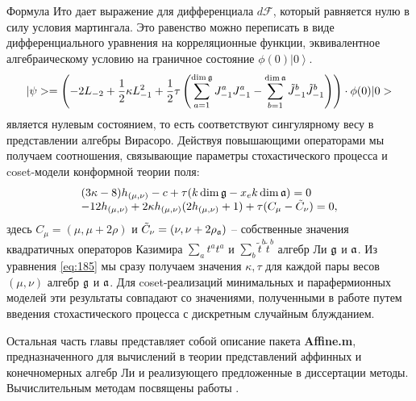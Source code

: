 \documentclass[14pt,autoref,href,facsimile
]{disser}
\begin{document}
Формула Ито дает выражение для дифференциала $d\mathcal{F}$, который равняется нулю в силу условия мартингала. Это равенство можно переписать в виде дифференциального уравнения на корреляционные функции, эквивалентное   алгебраическому условию на граничное состояние $\phi(0)\left|0\right>$.
\begin{multline}
\label{eq:126}
|\psi>=\left(-2L_{-2}+\frac{1}{2}\kappa L_{-1}^{2}+\frac{1}{2}\tau \left(\sum_{a=1}^{\dim\mathfrak{g}}J^{a}_{-1}J^{a}_{-1}-\sum_{b=1}^{\dim\mathfrak{a}}\tilde{J}^{b}_{-1}\tilde{J}^{b}_{-1}\right)\right)
\cdot\phi(0)|0>
\end{multline}
является нулевым состоянием, то есть соответствуют сингулярному весу в представлении алгебры Вирасоро. Действуя повышающими операторами мы получаем соотношения, связывающие параметры стохастического процесса и coset-модели конформной теории поля:
\begin{equation}
\label{eq:185}
\begin{array}{l}
 (3\kappa-8)h_{(\mu,\nu)}-c+\tau (k\dim\mathfrak{g}-x_{e}k\dim\mathfrak{a}) =0\\
 -12 h_{(\mu,\nu)}+2\kappa h_{(\mu,\nu)} (2h_{(\mu,\nu)}+1) + \tau
(C_{\mu}-\tilde{C}_{\nu})=0,
\end{array}
\end{equation}
здесь $C_{\mu}=(\mu,\mu+2\rho)$ и $\tilde{C}_{\nu}=(\nu,\nu+2\rho_{\mathfrak{a}})$ -- собственные значения квадратичных операторов Казимира $\sum_{a}t^{a}t^{a}$ и $\sum_{b}\tilde{t}^{b}\tilde{t}^{b}$ алгебр Ли $\mathfrak{g}$ и $\mathfrak{a}$.
Из уравнения \eqref{eq:185} мы сразу получаем значения  $\kappa,\tau$ для каждой пары весов $(\mu,\nu)$ алгебр $\mathfrak{g}$ и $\mathfrak{a}$. Для coset-реализаций минимальных и парафермионных моделей эти результаты совпадают со значениями, полученными в работе \cite{santachiara2008sle} путем введения стохастического процесса с дискретным случайным блужданием.

Остальная часть главы представляет собой описание пакета {\bf Affine.m}, предназначенного для вычислений в теории представлений аффинных и конечномерных алгебр Ли и реализующего предложенные в диссертации методы. Вычислительным методам посвящены работы .
\vspace{-0.7cm}
\setlength{\parskip}{-0.5ex}
\renewcommand\bibsection{\nsection{Список публикаций}}
\end{document}
